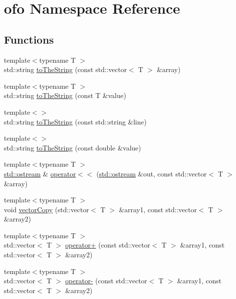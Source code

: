 \hypertarget{namespaceofo}{}\section{ofo Namespace Reference}
\label{namespaceofo}
\subsection*{Functions}
\begin{DoxyCompactItemize}
\item 
{\footnotesize template$<$typename T $>$ }\\std\+::string \mbox{\hyperlink{namespaceofo_a69e3fd282eb0698e75471037b3bf5c14}{to\+The\+String}} (const std\+::vector$<$ T $>$ \&array)
\item 
{\footnotesize template$<$typename T $>$ }\\std\+::string \mbox{\hyperlink{namespaceofo_a2c6e4d8296036cbf1f27a0e785d203e1}{to\+The\+String}} (const T \&value)
\item 
{\footnotesize template$<$$>$ }\\std\+::string \mbox{\hyperlink{namespaceofo_ac9cdba42766a85130c57eb07fd5bd5e5}{to\+The\+String}} (const std\+::string \&line)
\item 
{\footnotesize template$<$$>$ }\\std\+::string \mbox{\hyperlink{namespaceofo_a7afe8b17c1060a8756bff591f3a6e163}{to\+The\+String}} (const double \&value)
\item 
{\footnotesize template$<$typename T $>$ }\\\mbox{\hyperlink{doctest_8h_a116af65cb5e924b33ad9d9ecd7a783f3}{std\+::ostream}} \& \mbox{\hyperlink{namespaceofo_ac3a7d5d99908e98ee6b8c1808805ee20}{operator$<$$<$}} (\mbox{\hyperlink{doctest_8h_a116af65cb5e924b33ad9d9ecd7a783f3}{std\+::ostream}} \&out, const std\+::vector$<$ T $>$ \&array)
\item 
{\footnotesize template$<$typename T $>$ }\\void \mbox{\hyperlink{namespaceofo_a172e86f4c58be11de0b77ba5bb670638}{vector\+Copy}} (std\+::vector$<$ T $>$ \&array1, const std\+::vector$<$ T $>$ \&array2)
\item 
{\footnotesize template$<$typename T $>$ }\\std\+::vector$<$ T $>$ \mbox{\hyperlink{namespaceofo_acbaf18732443a853d482cebefb9f6e98}{operator+}} (const std\+::vector$<$ T $>$ \&array1, const std\+::vector$<$ T $>$ \&array2)
\item 
{\footnotesize template$<$typename T $>$ }\\std\+::vector$<$ T $>$ \mbox{\hyperlink{namespaceofo_acb123ddb76ace937baf29a4b6f2fcd8a}{operator-\/}} (const std\+::vector$<$ T $>$ \&array1, const std\+::vector$<$ T $>$ \&array2)

\end{DoxyCompactItemize}
